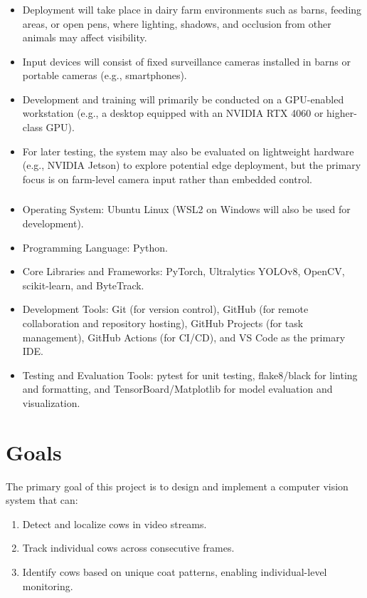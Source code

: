 \documentclass{article}
\begin{document}
\subsubsection*{\color{blue}{Hardware Environment}}
\begin{itemize}
    \item Deployment will take place in dairy farm environments such as barns, feeding areas, or open pens, 
          where lighting, shadows, and occlusion from other animals may affect visibility.
    \item Input devices will consist of fixed surveillance cameras installed in barns or portable cameras (e.g., smartphones).
    \item Development and training will primarily be conducted on a GPU-enabled workstation 
      (e.g., a desktop equipped with an NVIDIA RTX 4060 or higher-class GPU).
    \item For later testing, the system may also be evaluated on lightweight hardware (e.g., NVIDIA Jetson) 
          to explore potential edge deployment, but the primary focus is on farm-level camera input rather than embedded control.
\end{itemize}


\subsubsection*{\color{blue}{Software Environment}}
\begin{itemize}
    \item Operating System: Ubuntu Linux (WSL2 on Windows will also be used for development).
    \item Programming Language: Python.
    \item Core Libraries and Frameworks: PyTorch, Ultralytics YOLOv8, OpenCV, scikit-learn, and ByteTrack.
    \item Development Tools: Git (for version control), GitHub (for remote collaboration and repository hosting), 
      GitHub Projects (for task management), GitHub Actions (for CI/CD), and VS Code as the primary IDE.
    \item Testing and Evaluation Tools: pytest for unit testing, flake8/black for linting and formatting, 
          and TensorBoard/Matplotlib for model evaluation and visualization.
\end{itemize}



\section{Goals}
The primary goal of this project is to design and implement a computer vision system that can:
    \begin{enumerate}
        \item Detect and localize cows in video streams.
        \item Track individual cows across consecutive frames.
        \item Identify cows based on unique coat patterns, enabling individual-level monitoring.
    \end{enumerate}
\end{document}

